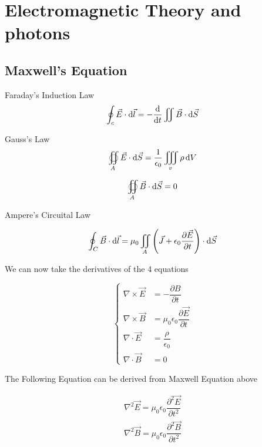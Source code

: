 \chapter{Electromagnetic Theory and photons}

\section{Maxwell's Equation}

Faraday's Induction Law
\begin{equation}
  \oint_{c} \vec{E} \cdot \mathop{}\!\mathrm{d} \vec{l} = - \dfrac{\mathop{}\!\mathrm{d}}{\mathop{}\!\mathrm{d} t} \iint \vec{B} \cdot \mathop{}\!\mathrm{d} \vec{S}
\end{equation}

Gauss's Law
\begin{equation}
  \oiint_{A} \vec{E} \cdot \mathop{}\!\mathrm{d} \vec{S} = \dfrac{1}{\epsilon_{0}} \iiint_{v} \rho \mathop{}\!\mathrm{d} V 
\end{equation}

\begin{equation}
  \oiint_{A} \vec{B} \cdot \mathop{}\!\mathrm{d} \vec{S} = 0
\end{equation}

Ampere's Circuital Law

\begin{equation}
  \oint_{C} \vec{B} \cdot \mathop{}\!\mathrm{d} \vec{l} = \mu_{0} \iint_{A} \left( \vec{J} + \epsilon_{0} \dfrac{\partial \vec{E}}{\partial t}  \right) \cdot \mathop{}\!\mathrm{d} \vec{S}
\end{equation}

We can now take the derivatives of the 4 equations

\begin{equation}
  \left\{
  \begin{aligned}
    \nabla \times \vec{E} &= - \dfrac{\partial B}{\partial t} \\
    \nabla \times \vec{B} &= \mu_{0} \epsilon_{0} \dfrac{\partial \vec{E}}{\partial t}  \\
    \nabla \cdot \vec{E} &= \dfrac{\rho}{\epsilon_{0}} \\
    \nabla \cdot \vec{B} &= 0
  \end{aligned}
  \right.
\end{equation}

The Following Equation can be derived from Maxwell Equation above

\begin{equation}
  \begin{aligned}
    \nabla^{2} \vec{E} = \mu_{0} \epsilon_{0} \dfrac{\partial^{2} \vec{E}}{\partial t^{2}}\\
    \nabla^{2} \vec{B} = \mu_{0} \epsilon_{0} \dfrac{\partial^{2} \vec{B}}{\partial t^{2}} 
  \end{aligned}
\end{equation}

